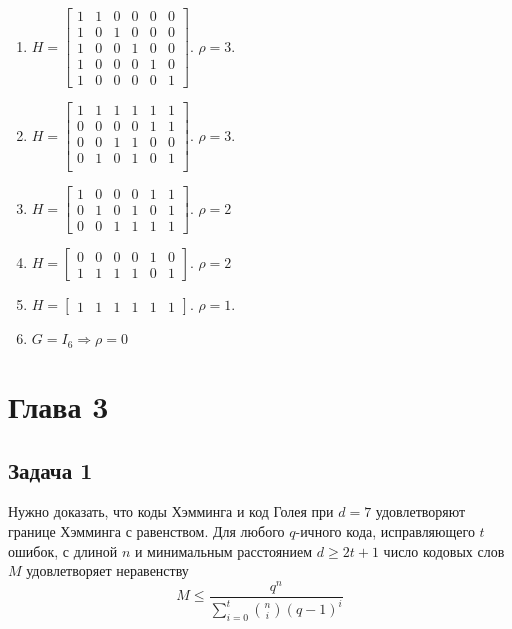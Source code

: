 \documentclass{article}
\begin{document}
\begin{enumerate}
    \item $H = 
          \begin{bmatrix}
            1 & 1 & 0 & 0 & 0 & 0 \\	
            1 & 0 & 1 & 0 & 0 & 0 \\	
            1 & 0 & 0 & 1 & 0 & 0 \\	
            1 & 0 & 0 & 0 & 1 & 0 \\	
            1 & 0 & 0 & 0 & 0 & 1
          \end{bmatrix}$.
          $\rho=3$.
    \item $H=
            \begin{bmatrix}
                1 & 1 & 1 & 1 & 1 & 1 \\
                0 & 0 & 0 & 0 & 1 & 1 \\
                0 & 0 & 1 & 1 & 0 & 0 \\
                0 & 1 & 0 & 1 & 0 & 1 \\
            \end{bmatrix}$. $\rho=3$.
    \item $H = 
            \begin{bmatrix}
            1 & 0 & 0 & 0 & 1 & 1 \\
            0 & 1 & 0 & 1 & 0 & 1 \\
            0 & 0 & 1 & 1 & 1 & 1
            \end{bmatrix}$. $\rho=2$
    \item $H=
            \begin{bmatrix}
                0 & 0 & 0 & 0 & 1 & 0 \\
                1 & 1 & 1 & 1 & 0 & 1
            \end{bmatrix}$. $\rho=2$
    \item $H=
            \begin{bmatrix}
                1 & 1 & 1 & 1 & 1 & 1
            \end{bmatrix}$. $\rho=1$.
    \item $G=I_{6} \Rightarrow \rho=0$ 
\end{enumerate}
\section{Глава 3}
\subsection{Задача 1}
Нужно доказать, что коды Хэмминга и код Голея при $d = 7$ удовлетворяют границе Хэмминга с равенством. Для любого $q$-ичного кода, исправляющего $t$ ошибок, с длиной $n$ и минимальным расстоянием $d \geq 2t + 1$ число кодовых слов $M$ удовлетворяет
неравенству
%
$$M \leq \frac{q^{n}}{\sum^{t}_{i=0}\binom{n}{i}(q-1)^{i}}$$
%
\end{document}
